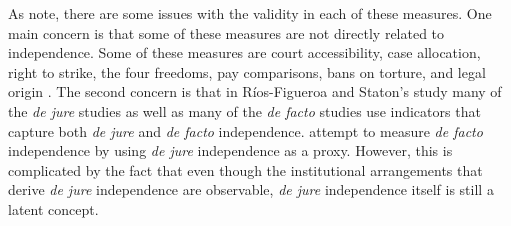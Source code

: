 \documentclass[12pt]{article}
\begin{document}
As \citet{Rios2014} note, there are some issues with the validity in each of these measures.  One main concern is that some of these measures are not directly related to independence.  Some of these measures are court accessibility, case allocation, right to strike, the four freedoms, pay comparisons, bans on torture, and legal origin \citep{Feld2003,Keith2002a,Laporta2004,Rios2014}.  The second concern is that in R\'{i}os-Figueroa and Staton's study many of the \textit{de jure} studies as well as many of the \textit{de facto} studies use indicators that capture both \textit{de jure} and \textit{de facto} independence.  \citet{Laporta2004} attempt to measure \textit{de facto} independence by using \textit{de jure} independence as a proxy.  However, this is complicated by the fact that even though the institutional arrangements that derive \textit{de jure} independence are observable, \textit{de jure} independence itself is still a latent concept. 
\end{document}
